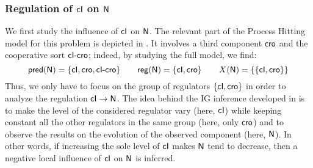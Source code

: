 \subsubsection{Regulation of $\mathsf{cI}$ on $\mathsf{N}$}

We first study the influence of $\mathsf{cI}$ on $\mathsf{N}$.
The relevant part of the Process Hitting model for this problem is depicted in
.
It involves a third component $\mathsf{cro}$ and the cooperative sort $\mathsf{cI\mbox{-}cro}$;
indeed, by studying the full model, we find:
\[\mathsf{pred}(\mathsf{N}) = \{ \mathsf{cI}, \mathsf{cro}, \mathsf{cI\mbox{-}cro} \} \qquad
  \mathsf{reg}({\mathsf{N}}) = \{ \mathsf{cI}, \mathsf{cro} \} \qquad
  X(\mathsf{N}) = \{ \{ \mathsf{cI}, \mathsf{cro} \} \}\]
Thus, we only have to focus on the group of regulators $\{ \mathsf{cI}, \mathsf{cro} \}$
in order to analyze the regulation $\mathsf{cI} \rightarrow \mathsf{N}$.
The idea behind the IG inference developed in 
is to make the level of the considered regulator vary (here, $\mathsf{cI}$)
while keeping constant all the other regulators in the same group (here, only $\mathsf{cro}$)
and to observe the results on the evolution of the observed component (here, $\mathsf{N}$).
In other words, if increasing the sole level of $\mathsf{cI}$ makes $\mathsf{N}$ tend to decrease,
then a negative local influence of $\mathsf{cI}$ on $\mathsf{N}$ is inferred.


